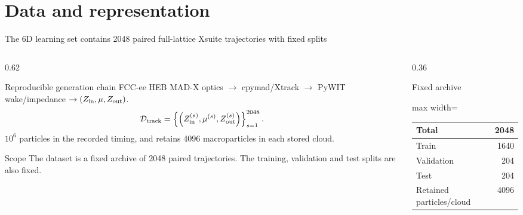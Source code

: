 \section{Data and representation}
\begin{frame}[t,shrink=5]{The 6D learning set contains 2048 paired full-lattice Xsuite trajectories with fixed splits}
\begin{columns}[T,onlytextwidth]
\begin{column}{0.62\textwidth}
\begin{block}{Reproducible generation chain}
FCC-ee HEB MAD-X optics $\to$ cpymad/Xtrack $\to$ PyWIT wake/impedance $\to (Z_{\rm in},\mu,Z_{\rm out})$.
\[\mathcal D_{\rm track}=\left\{\left(Z_{\rm in}^{(s)},\mu^{(s)},Z_{\rm out}^{(s)}\right)\right\}_{s=1}^{2048}.\]
$10^6$ particles in the recorded timing, and retains 4096 macroparticles in each stored cloud.
\end{block}
\begin{block}{Scope}
The dataset is a fixed archive of 2048 paired trajectories. The training, validation and test splits are also fixed.
\end{block}

\end{column}
\begin{column}{0.36\textwidth}
\begin{block}{Fixed archive}
\begin{center}\begin{adjustbox}{max width=\linewidth}
\begin{tabular}{lr}\toprule Total & 2048\\\midrule Train & 1640\\Validation & 204\\Test & 204\\Retained particles/cloud & 4096\\\bottomrule\end{tabular}
\end{adjustbox}\end{center}
\end{block}

\end{column}
\end{columns}


\end{frame}

